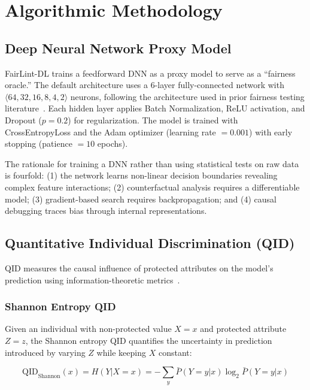 \chapter{Algorithmic Methodology}
\label{ch:methodology}

\section{Deep Neural Network Proxy Model}

FairLint-DL trains a feedforward DNN as a proxy model to serve as a ``fairness oracle.'' The default architecture uses a 6-layer fully-connected network with $\langle 64, 32, 16, 8, 4, 2 \rangle$ neurons, following the architecture used in prior fairness testing literature~\cite{dice, neufair}. Each hidden layer applies Batch Normalization, ReLU activation, and Dropout ($p=0.2$) for regularization. The model is trained with CrossEntropyLoss and the Adam optimizer (learning rate $= 0.001$) with early stopping (patience $= 10$ epochs).

The rationale for training a DNN rather than using statistical tests on raw data is fourfold: (1) the network learns non-linear decision boundaries revealing complex feature interactions; (2) counterfactual analysis requires a differentiable model; (3) gradient-based search requires backpropagation; and (4) causal debugging traces bias through internal representations.

\section{Quantitative Individual Discrimination (QID)}

QID measures the causal influence of protected attributes on the model's prediction using information-theoretic metrics~\cite{dice}.

\subsection{Shannon Entropy QID}

Given an individual with non-protected value $X = x$ and protected attribute $Z = z$, the Shannon entropy QID quantifies the uncertainty in prediction introduced by varying $Z$ while keeping $X$ constant:

\begin{equation}
    \text{QID}_{\text{Shannon}}(x) = H(Y | X = x) = -\sum_{y} \bar{P}(Y=y | x) \log_2 \bar{P}(Y=y | x)
    \label{eq:qid_shannon}
\end{equation}

